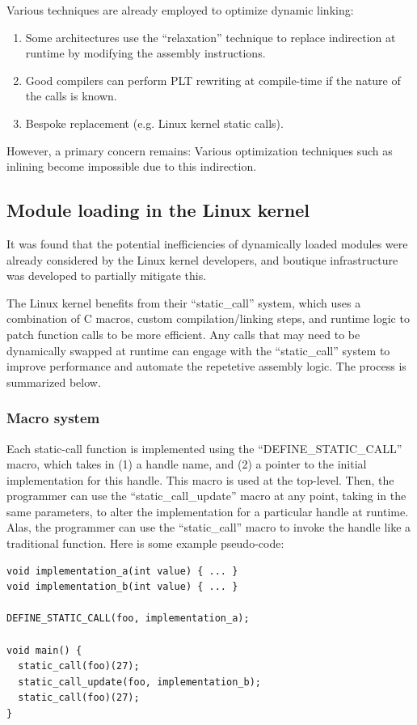 \documentclass[12pt,a4paper,twoside]{report}
\begin{document}
Various techniques are already employed to optimize dynamic linking:

\begin{enumerate}
  \item Some architectures use the ``relaxation'' technique to replace indirection at runtime by modifying the assembly instructions.
  \item Good compilers can perform PLT rewriting at compile-time if the nature of the calls is known.
  \item Bespoke replacement (e.g. Linux kernel static calls).
\end{enumerate} 

However, a primary concern remains: Various optimization techniques such as inlining become impossible due to this indirection.

\subsection{Module loading in the Linux kernel}

It was found that the potential inefficiencies of dynamically loaded modules were already considered by the Linux kernel developers, and boutique infrastructure was developed to partially mitigate this.

The Linux kernel benefits from their ``static\_call'' system, which uses a combination of C macros, custom compilation/linking steps, and runtime logic to patch function calls to be more efficient. Any calls that may need to be dynamically swapped at runtime can engage with the ``static\_call'' system to improve performance and automate the repetetive assembly logic. The process is summarized below.

\subsubsection{Macro system}

Each static-call function is implemented using the ``DEFINE\_STATIC\_CALL'' macro, which takes in (1) a handle name, and (2) a pointer to the initial implementation for this handle. This macro is used at the top-level. Then, the programmer can use the ``static\_call\_update'' macro at any point, taking in the same parameters, to alter the implementation for a particular handle at runtime. Alas, the programmer can use the ``static\_call'' macro to invoke the handle like a traditional function. Here is some example pseudo-code:

\begin{verbatim}
void implementation_a(int value) { ... }
void implementation_b(int value) { ... }

DEFINE_STATIC_CALL(foo, implementation_a);

void main() {
  static_call(foo)(27);
  static_call_update(foo, implementation_b);
  static_call(foo)(27);
}
\end{verbatim}
\end{document}
